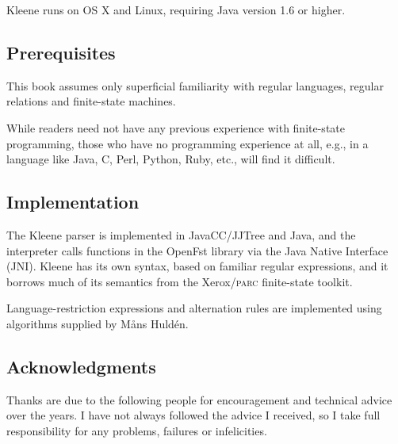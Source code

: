 \documentclass[letterpaper,12pt]{book}
\providecommand\acro[1]{}
\renewcommand\acro[1]{\textsc{#1}}
\providecommand{\init}{}\renewcommand{\init}{\MakeUppercase}
\newcommand{\Kleene}{Kleene}
\newcommand{\jni}{\init{jni}}
\newcommand{\CPP}{C\nolinebreak[4]\hspace{-.09em}\raisebox{.3ex}{\footnotesize\bf
+}\nolinebreak\hspace{-.25em}\raisebox{.3ex}{\footnotesize\bf +}}
\begin{document}
Kleene runs on OS X and Linux, requiring Java version 1.6 or higher. 

\subsection*{Prerequisites}

This book assumes only superficial familiarity with regular languages,
regular relations and finite-state machines.

While readers need not have any previous experience with finite-state
programming, those who have no programming experience at all, e.g., in a language
like Java, \CPP{}, Perl, Python, Ruby, etc., will find it difficult.

\subsection*{Implementation}

The \Kleene{} parser is implemented in
JavaCC/JJTree and
Java, and the
interpreter calls functions in the OpenFst library via the Java
Native Interface
(\jni).  Kleene has its own syntax, based on
familiar regular expressions, and it borrows much of its semantics from
the Xerox/\acro{parc} finite-state
toolkit.

Language-restriction expressions and alternation rules are implemented using
algorithms supplied by M\r{a}ns Huld\'en.

\subsection*{Acknowledgments}

Thanks are due to the following people for encouragement and technical
advice over
the years.  I have not always followed the advice I received, so I take 
full responsibility for any problems, failures or infelicities.
\end{document}
